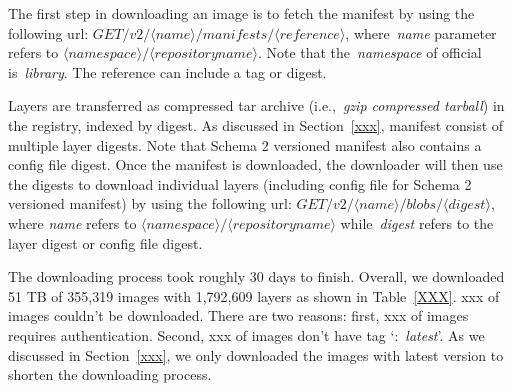 The first step in downloading an image is to fetch the manifest by using the following url: $GET /v2/\langle name \rangle/manifests/\langle reference \rangle$, where~\textit{name} parameter refers to $\langle namespace\rangle/\langle repository name \rangle$.
%
Note that the~\textit{namespace} of official is~\textit{library}.
%
The reference can include a tag or digest.
%
%



%
Layers are transferred as compressed tar archive (i.e.,~\textit{gzip compressed tarball}) in the registry, indexed by digest.
%
%
As discussed in Section~\ref{xxx}, manifest consist of multiple layer digests.
%
Note that Schema 2 versioned manifest also contains a config file digest.
%
Once the manifest is downloaded, the downloader will then use the digests to download individual layers (including config file for Schema 2 versioned manifest) by using the following url: $GET /v2/\langle name \rangle/blobs/\langle digest \rangle$, where \textit{name} refers to $\langle namespace\rangle/\langle repository name \rangle$ while~\textit{digest} refers to the layer digest or config file digest.

%
%


The downloading process took roughly 30 days to finish.
%
Overall, we downloaded 51 TB of 355,319 images with 1,792,609 layers as shown in Table~\ref{XXX}.
%
xxx of images couldn't be downloaded.
%
There are two reasons: first, xxx of images requires authentication.
%
Second, xxx of images don't have tag `:~\textit{latest}'.
%
As we discussed in Section~\ref{xxx}, we only downloaded the images with latest version to shorten the downloading process.





